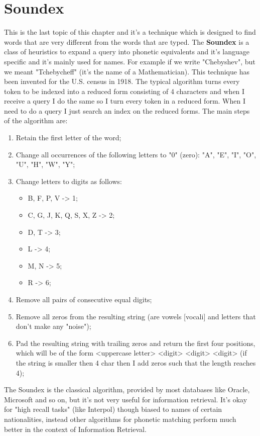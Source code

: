 \section{Soundex}
This is the last topic of this chapter and it's a technique which is designed to find words that are very different from the words that are typed. 
The \textbf{Soundex} is a class of heuristics to expand a query into phonetic equivalents and it's language specific and it's mainly used for names. For example if we write "Chebyshev", but we meant "Tchebycheff" (it's the name of a Mathematician). This technique has been invented for the U.S. census in 1918.\newline
The typical algorithm turns every token to be indexed into a reduced form consisting of 4 characters and when I receive a query I do the same so I turn every token in a reduced form. When I need to do a query I just search an index on the reduced forms.\newline
The main steps of the algorithm are:
\begin{enumerate}
    \item Retain the first letter of the word;
    \item Change all occurrences of the following letters to "0" (zero): "A", "E", "I", "O", "U", "H", "W", "Y";
    \item Change letters to digits as follows:
    \begin{itemize}
        \item B, F, P, V -> 1;
        \item C, G, J, K, Q, S, X, Z -> 2;
        \item D, T -> 3;
        \item L -> 4;
        \item M, N -> 5;
        \item R -> 6;
    \end{itemize}
    \item Remove all pairs of consecutive equal digits;
    \item Remove all zeros from the resulting string (are vowels [vocali] and letters that don't make any "noise");
    \item Pad the resulting string with trailing zeros and return the first four positions, which will be of the form <uppercase letter> <digit> <digit> <digit> (if the string is smaller then 4 char then I add zeros such that the length reaches 4);
\end{enumerate}
The Soundex is the classical algorithm, provided by most databases like Oracle, Microsoft and so on, but it's not very useful for information retrieval. It's okay for "high recall tasks" (like Interpol) though biased to names of certain nationalities, instead other algorithms for phonetic matching perform much better in the context of Information Retrieval.
